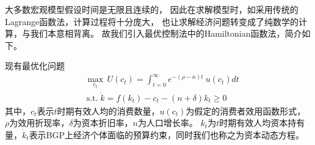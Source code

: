 \documentclass[cn,normal,11pt,black]{elegantnote}
\begin{document}
\begin{theorem}[Hamiltonian函数]
    大多数宏观模型假设时间是无限且连续的，
    因此在求解模型时，如采用传统的Lagrange函数法，计算过程将十分庞大，
    也让求解经济问题转变成了纯数学的计算，与我们本意相背离。
    故我们引入最优控制法中的Hamiltonian函数法，简介如下。
    
    现有最优化问题
    \begin{align*}
        & \max _{c_t} \,  U(c_t) = \int_{t=0}^{\infty} e^{- (\rho -n) t} \ u(c_t) d t \\ 
        & \, \mathrm{s.t.} \; \dot{k}=f(k_t)-c_t- (n + \delta) k_t \ge 0
    \end{align*}
    其中，$c_t$表示$t$时期有效人均的消费数量，$u(c_t)$为假定的消费者效用函数形式，
    $\rho$为效用折现率，$\delta$为资本折旧率，$n$为人口增长率。
    $k_t$为$t$时期有效人均资本持有量，$\dot{k}_t$表示BGP上经济个体面临的预算约束，同时我们也称之为资本动态方程。


\end{theorem}
\end{document}
